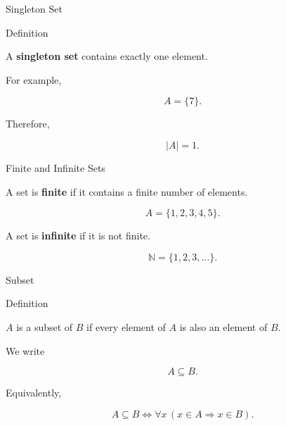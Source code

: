 \documentclass[aspectratio=169,11pt]{beamer}
\begin{document}
\begin{frame}{Singleton Set}

\begin{block}{Definition}

A \textbf{singleton set} contains exactly one element.

\end{block}

\vspace{0.35cm}

For example,

\[
A=\{7\}.
\]

Therefore,

\[
\boxed{|A|=1}.
\]

\end{frame}


\begin{frame}{Finite and Infinite Sets}

A set is \textbf{finite} if it contains a finite number
of elements.

\[
A=\{1,2,3,4,5\}.
\]

\vspace{0.35cm}

A set is \textbf{infinite} if it is not finite.

\[
\mathbb N=\{1,2,3,\ldots\}.
\]

\end{frame}


\begin{frame}{Subset}

\begin{block}{Definition}

$A$ is a subset of $B$ if every element of $A$ is also
an element of $B$.

\end{block}

\vspace{0.35cm}

We write

\[
\boxed{A\subseteq B}.
\]

\vspace{0.3cm}

Equivalently,

\[
A\subseteq B
\iff
\forall x\,(x\in A\Rightarrow x\in B).
\]

\end{frame}
\end{document}
